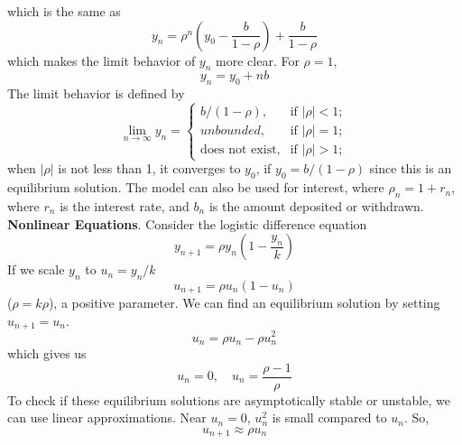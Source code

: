     which is the same as
    \begin{equation*}
        y_n = \rho^n (y_0 - \frac{b}{1 - \rho}) + \frac{b}{1 - \rho}
    \end{equation*}
    which makes the limit behavior of $y_n$ more clear. For $\rho = 1$,
    \begin{equation*}
        y_n = y_0 + nb
    \end{equation*}
    The limit behavior is defined by 
    \begin{equation*}
        \lim_{n \rightarrow \infty} y_n = \begin{cases}
            b/(1 - \rho), & \text{if } |\rho| < 1; \\
            unbounded, & \text{if } |\rho| = 1; \\
            \text{does not exist}, & \text{if } |\rho| > 1;
        \end{cases}
    \end{equation*}
    when $|\rho|$ is not less than 1, it converges to $y_0$, if $y_0 = b/(1 - \rho)$ since this is an equilibrium solution.
    \newline \indent
    The model can also be used for interest, where $\rho_n = 1 + r_n$, where $r_n$ is the interest rate, and $b_n$ is the amount deposited or withdrawn.
    \newline \indent
    \textbf{Nonlinear Equations}. Consider the logistic difference equation
    \begin{equation*}
        y_{n + 1} = \rho y_n (1 - \frac{y_n}{k})
    \end{equation*}
    If we scale $y_n$ to $u_n = y_n/k$
    \begin{equation*}
        u_{n+1} = \rho u_n (1 - u_n)
    \end{equation*}
    ($\rho = k\rho$), a positive parameter. We can find an equilibrium solution by setting $u_{n+1} = u_n$.
    \begin{equation*}
        u_n = \rho u_n - \rho u_n^2
    \end{equation*}
    which gives us
    \begin{equation*}
        u_n = 0, \quad u_n = \frac{\rho - 1}{\rho}
    \end{equation*}
    To check if these equilibrium solutions are asymptotically stable or unstable, we can use linear approximations. Near $u_n = 0$, $u_n^2$ is small compared to $u_n$. So,
    \begin{equation*}
        u_{n+1} \approx \rho u_n
    \end{equation*}

